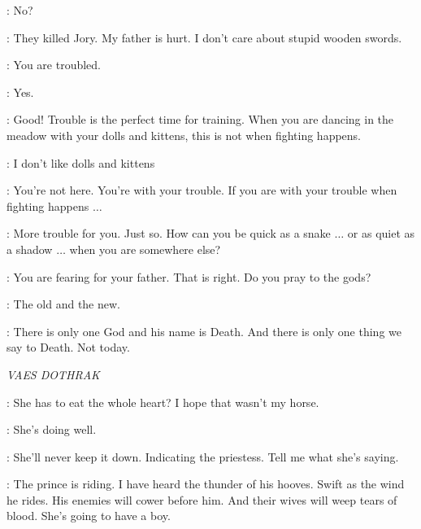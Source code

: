 \SYRIO: No? 

\ARYA: They killed Jory. My father is hurt. I don't care about stupid wooden swords. 

\SYRIO: You are troubled. 

\ARYA: Yes. 

\SYRIO: Good! Trouble is the perfect time for training. When you are dancing in the meadow with your dolls and kittens, this is not when fighting happens. 

\ARYA: I don't like dolls and kittens


\SYRIO: You're not here. You're with your trouble. If you are with your trouble when fighting happens $\ldots$ 


\SYRIO: More trouble for you. Just so. How can you be quick as a snake $\ldots$ or as quiet as a shadow $\ldots$ when you are somewhere else?


\SYRIO: You are fearing for your father. That is right. Do you pray to the gods? 

\ARYA: The old and the new. 

\SYRIO: There is only one God and his name is Death. And there is only one thing we say to Death. Not today. 



\scene

\textit{VAES DOTHRAK} 


\VISERYS: She has to eat the whole heart? I hope that wasn't my horse. 


\JORAH: She's doing well. 

\VISERYS: She'll never keep it down. Indicating the priestess. Tell me what she's saying. 

\JORAH: The prince is riding. I have heard the thunder of his hooves. Swift as the wind he rides. His enemies will cower before him. And their wives will weep tears of blood. She's going to have a boy. 

